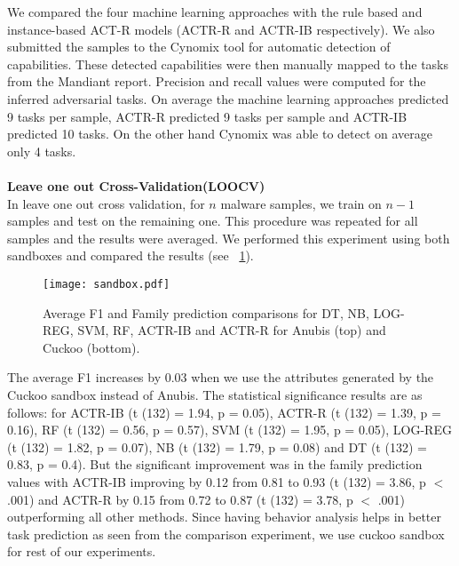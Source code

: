 \documentclass[conference]{IEEEtran}
\begin{document}
We compared the four machine learning approaches with the rule based and instance-based ACT-R models (ACTR-R and ACTR-IB respectively). We also submitted the samples to the Cynomix tool for automatic detection of capabilities. These detected capabilities were then manually mapped to the tasks from the Mandiant report. Precision and recall values were computed for the inferred adversarial tasks. On average the machine learning approaches predicted 9 tasks per sample, ACTR-R predicted 9 tasks per sample and ACTR-IB predicted 10 tasks. On the other hand Cynomix was able to detect on average only 4 tasks.\\\\
{\bf Leave one out Cross-Validation(LOOCV)}\\
In leave one out cross validation, for $n$ malware samples, we train on $n-1$ samples and test on the remaining one. This procedure was repeated for all samples and the results were averaged. We performed this experiment using both sandboxes and compared the results (see \figurename~\ref{fig:one}).

\begin{figure}[htp!]
	\centerline{\texttt{[image: sandbox.pdf]}}
	\vspace{0em}
	\caption{\textmd{Average F1 and Family prediction comparisons for DT, NB, LOG-REG, SVM, RF, ACTR-IB and ACTR-R for Anubis (top) and Cuckoo (bottom).}}
	\vspace{-1em}
	\label{fig:one}
\end{figure}

The average F1 increases by 0.03 when we use the attributes generated by the Cuckoo sandbox instead of Anubis. The statistical significance results are as follows: for ACTR-IB  (t (132) = 1.94, p = 0.05), ACTR-R (t (132) = 1.39, p = 0.16), RF (t (132) = 0.56, p = 0.57), SVM (t (132) = 1.95, p = 0.05), LOG-REG (t (132) = 1.82, p = 0.07), NB (t (132) = 1.79, p = 0.08) and DT (t (132) = 0.83, p = 0.4). But the significant improvement was in the family prediction values with ACTR-IB improving by 0.12 from 0.81 to 0.93 (t (132) = 3.86, p $<$ .001) and ACTR-R by 0.15 from 0.72 to 0.87 (t (132) = 3.78, p $<$ .001) outperforming all other methods. Since having behavior analysis helps in better task prediction as seen from the comparison experiment, we use cuckoo sandbox for rest of our experiments.
\end{document}
